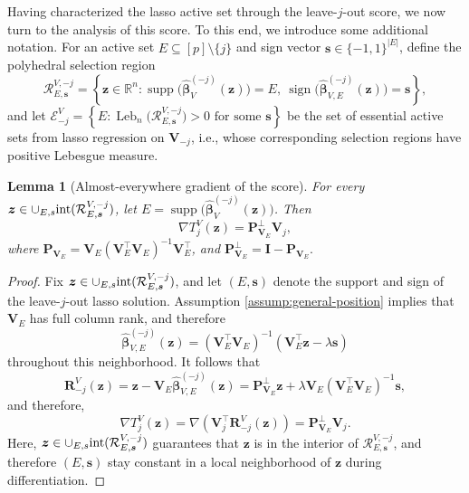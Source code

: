 \documentclass[12pt]{article}
\newtheorem{lemma}{Lemma}
\theoremstyle{definition}
\begin{document}
Having characterized the lasso active set through the leave-$j$-out score, we now turn to the analysis of this score. To this end, we introduce some additional notation.
For an active set $E\subseteq[p]\setminus\{j\}$ and sign vector
$\boldsymbol s\in\{-1,1\}^{|E|}$, define the polyhedral selection region
\[
    \mathcal R_{E,\boldsymbol s}^{V,-j}
    =
    \left\{
        \boldsymbol z\in\mathbb R^n:
        \operatorname{supp}\bigl(\widehat{\boldsymbol\beta}_V^{(-j)}(\boldsymbol z)\bigr)=E,\ 
        \operatorname{sign}\bigl(\widehat{\boldsymbol\beta}_{V,E}^{(-j)}(\boldsymbol z)\bigr)=\boldsymbol s
    \right\},
\]
and let $\mathcal E_{-j}^V=\left\{E:\operatorname{Leb}_n\bigl(\mathcal R_{E,\boldsymbol s}^{V,-j}\bigr)>0\text{ for some }\boldsymbol s\right\}$
be the set of essential active sets from lasso regression on $\bm{V}_{-j}$, i.e., whose corresponding selection regions have positive Lebesgue measure.

\begin{lemma}[Almost-everywhere gradient of the score]
\label{lem:ae-gradient-score}
For every $\boldsymbol z\in \cup_{E,s} \text{\normalfont int}(\mathcal R_{E,\boldsymbol s}^{V,-j})$, let
$E=\operatorname{supp}\bigl(\widehat{\boldsymbol\beta}_V^{(-j)}(\boldsymbol z)\bigr)$.
Then
\[
    \nabla T_j^V(\boldsymbol z)=\boldsymbol P_{\boldsymbol V_E}^\perp \boldsymbol V_j,
\]
where
$ \boldsymbol P_{\boldsymbol V_E}=\boldsymbol V_E(\boldsymbol V_E^\top \boldsymbol V_E)^{-1}\boldsymbol V_E^\top$, and 
    $\boldsymbol P_{\boldsymbol V_E}^\perp=\boldsymbol I-\boldsymbol P_{\boldsymbol V_E}.$
\end{lemma}

\begin{proof}
Fix $\boldsymbol z\in \cup_{E,s} \text{\normalfont int}(\mathcal R_{E,\boldsymbol s}^{V,-j})$, and let $(E,\boldsymbol s)$ denote the support and sign of
the leave-$j$-out lasso solution. 
Assumption \ref{assump:general-position} implies that $\boldsymbol V_E$ has full column rank, and therefore
\[
    \widehat{\boldsymbol\beta}_{V,E}^{(-j)}(\boldsymbol z)
    =
    (\boldsymbol V_E^\top \boldsymbol V_E)^{-1}(\boldsymbol V_E^\top \boldsymbol z-\lambda\boldsymbol s)
\]
throughout this neighborhood. 
It follows that
\[
    \boldsymbol R_{-j}^V(\boldsymbol z)
    =
    \boldsymbol z-\boldsymbol V_E\widehat{\boldsymbol\beta}_{V,E}^{(-j)}(\boldsymbol z)
    =
    \boldsymbol P_{\boldsymbol V_E}^\perp \boldsymbol z
    +
    \lambda \boldsymbol V_E(\boldsymbol V_E^\top \boldsymbol V_E)^{-1}\boldsymbol s,
\]
and therefore,
\[
    \nabla T_j^V(\boldsymbol z)
    =
    \nabla\left(\boldsymbol V_j^\top \boldsymbol R_{-j}^V(\boldsymbol z)\right)
    =
    \boldsymbol P_{\boldsymbol V_E}^\perp \boldsymbol V_j.
\]
Here, $\bm{z} \in \cup_{E,s} \text{\normalfont int}(\mathcal R_{E,\boldsymbol s}^{V,-j})$ guarantees that $\bm z$ is in the interior of $\mathcal R_{E,\boldsymbol s}^{V,-j}$, and therefore $(E, \bm s)$ stay constant in a local neighborhood of $\bm z$ during differentiation.
\end{proof}
\end{document}
